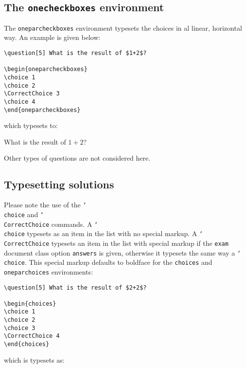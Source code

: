 \documentclass[12pt,a4paper]{exam}
\providecommand{\texorpdfstring}[2]{#1}
\newcommand{\bs}{\texorpdfstring{\char`\\}{}}
\begin{document}
\subsection{The \texttt{onecheckboxes} environment}

The \texttt{oneparcheckboxes} environment typesets the choices
in al linear, horizontal way. An example is given below:

\begin{lstlisting}
\question[5] What is the result of $1+2$?

\begin{oneparcheckboxes}
\choice 1
\choice 2
\CorrectChoice 3
\choice 4
\end{oneparcheckboxes}
\end{lstlisting}

which typesets to:

\begin{questions}
\setcounter{question}{3}
\question[5] What is the result of $1+2$?

\begin{oneparcheckboxes}
\end{oneparcheckboxes}
\end{questions}

Other types of questions are not considered here.

\subsection{Typesetting solutions}
\label{sec:solutions}
Please note the use of the \texttt{\bs choice} and \texttt{\bs CorrectChoice}
commands. A \texttt{\bs choice} typesets as an item in the list with no special markup.
A \texttt{\bs CorrectChoice} typesets an item in the list with special markup if
the \texttt{exam} document class option \texttt{answers} is given, otherwise it
typesets the same way a \texttt{\bs choice}. This special
markup defaults to boldface for the \texttt{choices} and \texttt{oneparchoices}
environments:

\begin{lstlisting}
\question[5] What is the result of $2+2$?

\begin{choices}
\choice 1
\choice 2
\choice 3
\CorrectChoice 4
\end{choices}
\end{lstlisting}

which is typesets as:
\end{document}
